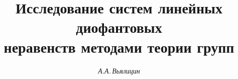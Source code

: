









\newcommand{\la}{\langle}


\newcommand{\ra}{\rangle}


\newcommand{\tts}[1]{}










\setcounter{page}{15}












\author{\it А.А.\,Вьялицин}


\title{Исследование систем линейных диофантовых\\


неравенств методами теории групп}







\date{}







\pagestyle{plain} %














